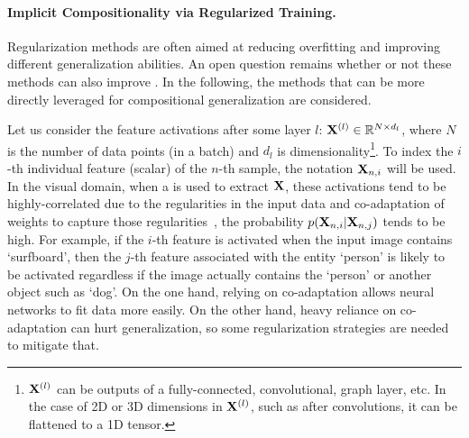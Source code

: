 \paragraph{Implicit Compositionality via Regularized Training.}

Regularization methods are often aimed at reducing overfitting and improving different generalization abilities. An open question remains whether or not these methods can also improve \cgshort.
In the following, the methods that can be more directly leveraged for compositional generalization are considered.

Let us consider the feature activations after some layer $l$: $\mathbf{X}^{(l)} \in \mathbb{R}^{N \times d_l}$, where 
$N$ is the number of data points (in a batch) and
$d_l$ is dimensionality\footnote{$\mathbf{X}^{(l)}$ can be outputs of a fully-connected, convolutional, graph layer, etc. In the case of 2D or 3D dimensions in $\mathbf{X}^{(l)}$, such as after convolutions, it can be flattened to a 1D tensor.}. 
To index the $i$-th individual feature (scalar) of the $n$-th sample, the notation $\mathbf{X}_{n,i}$ will be used.
In the visual domain, when a \cnn is used to extract $\mathbf{X}$, these activations tend to be highly-correlated due to the regularities in the input data and co-adaptation of weights to capture those regularities~\citep{hinton2012improving}, \ie the probability $p(\mathbf{X}_{n,i} | \mathbf{X}_{n,j})$ tends to be high. For example, if the $i$-th feature is activated when the input image contains `surfboard', then the $j$-th feature associated with the entity `person' is likely to be activated regardless if the image actually contains the `person' or another object such as `dog'. On the one hand, relying on co-adaptation allows neural networks to fit data more easily. %
On the other hand, heavy reliance on co-adaptation can hurt generalization, so some regularization strategies are needed to mitigate that.

